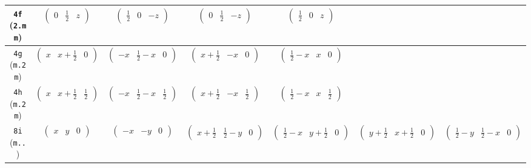 \documentclass[fleqn,9pt,landscape]{jsarticle}
\begin{document}
\begin{center}
\begin{longtable}{ccccccc}
{\tt 4f} ({\tt 2.mm}) & $ \begin{pmatrix} 0 & \frac{1}{2} & z \end{pmatrix} $ & $ \begin{pmatrix} \frac{1}{2} & 0 & - z \end{pmatrix} $ & $ \begin{pmatrix} 0 & \frac{1}{2} & - z \end{pmatrix} $ & $ \begin{pmatrix} \frac{1}{2} & 0 & z \end{pmatrix} $ & $  $ & $  $ \\ \hline
{\tt 4g} ({\tt m.2m}) & $ \begin{pmatrix} x & x + \frac{1}{2} & 0 \end{pmatrix} $ & $ \begin{pmatrix} - x & \frac{1}{2} - x & 0 \end{pmatrix} $ & $ \begin{pmatrix} x + \frac{1}{2} & - x & 0 \end{pmatrix} $ & $ \begin{pmatrix} \frac{1}{2} - x & x & 0 \end{pmatrix} $ & $  $ & $  $ \\ \hline
{\tt 4h} ({\tt m.2m}) & $ \begin{pmatrix} x & x + \frac{1}{2} & \frac{1}{2} \end{pmatrix} $ & $ \begin{pmatrix} - x & \frac{1}{2} - x & \frac{1}{2} \end{pmatrix} $ & $ \begin{pmatrix} x + \frac{1}{2} & - x & \frac{1}{2} \end{pmatrix} $ & $ \begin{pmatrix} \frac{1}{2} - x & x & \frac{1}{2} \end{pmatrix} $ & $  $ & $  $ \\ \hline
{\tt 8i} ({\tt m..}) & $ \begin{pmatrix} x & y & 0 \end{pmatrix} $ & $ \begin{pmatrix} - x & - y & 0 \end{pmatrix} $ & $ \begin{pmatrix} x + \frac{1}{2} & \frac{1}{2} - y & 0 \end{pmatrix} $ & $ \begin{pmatrix} \frac{1}{2} - x & y + \frac{1}{2} & 0 \end{pmatrix} $ & $ \begin{pmatrix} y + \frac{1}{2} & x + \frac{1}{2} & 0 \end{pmatrix} $ & $ \begin{pmatrix} \frac{1}{2} - y & \frac{1}{2} - x & 0 \end{pmatrix} $ \\

\end{longtable}
\end{center}
\end{document}
